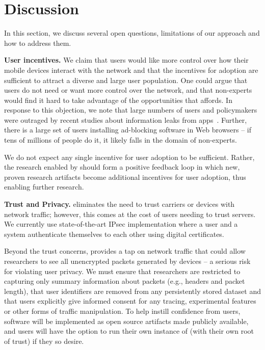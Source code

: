 \section{Discussion}
\label{sec:discuss}

In this section, we discuss several open questions, limitations of our approach and how to address them.

\noindent\textbf{User incentives.} We claim that users would like more control over how their mobile devices interact with 
the network and that the incentives for \meddle adoption are sufficient to attract a diverse and large user population. One 
could argue that users do not need or want more control over the network, and that non-experts would find it hard to take 
advantage of the opportunities that \meddle affords. In response to this objection, we note that large numbers of users and policymakers 
were outraged by recent studies about information leaks from apps~\cite{wsj:apps-watching-you}. Further, there is a large set of users installing ad-blocking software in Web browsers -- 
if tens of millions of people do it, it likely falls in the domain of non-experts. 

We do not expect any single incentive for user adoption to be sufficient. Rather, the 
research enabled by \meddle should form a positive feedback loop in which new, proven research artifacts become additional 
incentives for user adoption, thus enabling further research.

\noindent\textbf{Trust and Privacy.} \meddle eliminates the need to trust carriers or devices with network traffic; however, 
this comes at the cost of users needing to trust \meddle servers. We currently use state-of-the-art IPsec implementation where a user and a \meddle system authenticate themselves to each other using digital certificates.

Beyond the trust concerns, \meddle provides a tap on network traffic that could allow researchers to see all 
unencrypted packets generated by devices -- a serious risk for violating user privacy. We must ensure that 
researchers are restricted to capturing only summary information about packets (e.g., headers and packet length), 
that user identifiers are removed from any persistently stored dataset
and that users explicitly give informed consent 
for any tracing, experimental features or other forms of traffic manipulation. To help instill confidence from users, 
\meddle software will be implemented as open source artifacts made publicly available, and users will have 
the option to run their own instance of \meddle (with their own root of trust) if they so desire.

